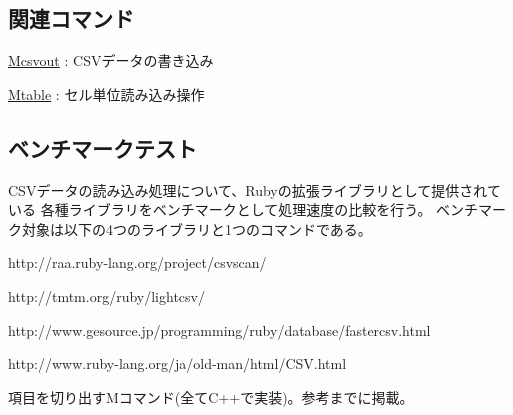 \subsection*{関連コマンド}
\hyperref[sect:mcsvoutRB]{Mcsvout} : CSVデータの書き込み

\hyperref[sect:mtableRB]{Mtable} : セル単位読み込み操作

\subsection{ベンチマークテスト}

CSVデータの読み込み処理について、Rubyの拡張ライブラリとして提供されている
各種ライブラリをベンチマークとして処理速度の比較を行う。
ベンチマーク対象は以下の4つのライブラリと1つのコマンドである。

\begin{description}
\setlength{\itemindent}{0mm}
\item[CSVScan] http://raa.ruby-lang.org/project/csvscan/
\item[LightCsv] http://tmtm.org/ruby/lightcsv/
\item[FasterCSV] http://www.gesource.jp/programming/ruby/database/fastercsv.html
\item[CSV] http://www.ruby-lang.org/ja/old-man/html/CSV.html
\item[mcut] 項目を切り出すMコマンド(全てC++で実装)。参考までに掲載。
\end{description}

